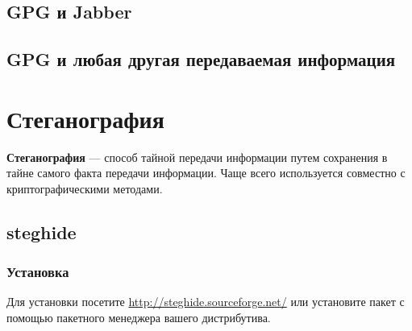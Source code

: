 \subsection{GPG и Jabber}
\subsection{GPG и любая другая передаваемая информация}

\section{Стеганография}
\textbf{Стеганография} --- способ тайной передачи информации путем сохранения в тайне самого факта передачи информации. Чаще всего используется совместно с криптографическими методами.

\subsection{steghide}
\subsubsection{Установка}
Для установки посетите \url{http://steghide.sourceforge.net/} или установите пакет с помощью пакетного менеджера вашего дистрибутива.
